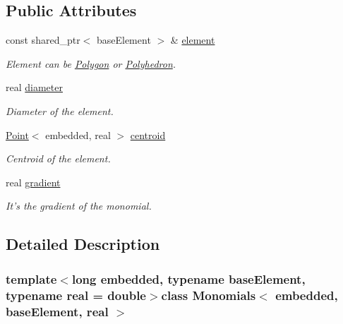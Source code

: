 \subsection*{\-Public \-Attributes}
\begin{DoxyCompactItemize}
\item 
\hypertarget{class_monomials_a6e5a84ffd4592bb8f0562cfe96c6f463}{const shared\-\_\-ptr$<$ base\-Element $>$ \& \hyperlink{class_monomials_a6e5a84ffd4592bb8f0562cfe96c6f463}{element}}\label{class_monomials_a6e5a84ffd4592bb8f0562cfe96c6f463}

\begin{DoxyCompactList}\small\item\em \-Element can be \hyperlink{class_polygon}{\-Polygon} or \hyperlink{class_polyhedron}{\-Polyhedron}. \end{DoxyCompactList}\item 
\hypertarget{class_monomials_ab425c9bddc36c5a049d2b115b57fd8eb}{real \hyperlink{class_monomials_ab425c9bddc36c5a049d2b115b57fd8eb}{diameter}}\label{class_monomials_ab425c9bddc36c5a049d2b115b57fd8eb}

\begin{DoxyCompactList}\small\item\em \-Diameter of the element. \end{DoxyCompactList}\item 
\hypertarget{class_monomials_af171e16a3bcdde2d4a35f5e1d3640b8e}{\hyperlink{class_point}{\-Point}$<$ embedded, real $>$ \hyperlink{class_monomials_af171e16a3bcdde2d4a35f5e1d3640b8e}{centroid}}\label{class_monomials_af171e16a3bcdde2d4a35f5e1d3640b8e}

\begin{DoxyCompactList}\small\item\em \-Centroid of the element. \end{DoxyCompactList}\item 
real \hyperlink{class_monomials_ae02f241eae47b3a21bedbb1c6e653273}{gradient}
\begin{DoxyCompactList}\small\item\em \-It's the gradient of the monomial. \end{DoxyCompactList}\end{DoxyCompactItemize}


\subsection{\-Detailed \-Description}
\subsubsection*{template$<$long embedded, typename base\-Element, typename real = double$>$class Monomials$<$ embedded, base\-Element, real $>$}

